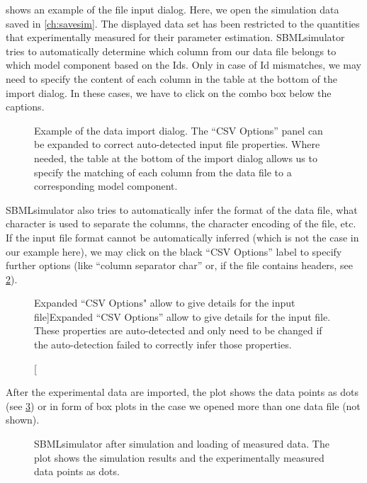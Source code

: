  shows an example of the file input dialog.
Here, we open the simulation data saved in \cref{ch:savesim}.
The displayed data set has been restricted to the quantities that \citeauthor{Bucher2011} experimentally measured for their parameter estimation.
SBMLsimulator tries to automatically determine which column from our data file belongs to which model component based on the \acp{Id}.
Only in case of \ac{Id} mismatches, we may need to specify the content of each column in the table at the bottom of the import dialog.
In these cases, we have to click on the combo box below the captions.
\begin{figure}[h]
\centering
{}
\caption[Example of the data import dialog]{Example of the data import dialog.
The ``CSV Options'' panel can be expanded to correct auto-detected input file properties.
Where needed, the table at the bottom of the import dialog allows us to specify the matching of each column from the data file to a corresponding model component.}
\label{fig:inputdialog}
\end{figure}

SBMLsimulator also tries to automatically infer the format of the data file, \eg what character is used to separate the columns, the character encoding of the file, etc.
If the input file format cannot be automatically inferred (which is not the case in our example here), we may click on the black ``CSV Options'' label to specify further options (like ``column separator char'' or, if the file contains headers, see \cref{fig:csvoptions}).
\begin{figure}[h]
\centering
{}
\caption[Expanded ``CSV Options" allow to give details for the input file]{Expanded ``CSV Options'' allow to give details for the input file.
These properties are auto-detected and only need to be changed if the auto-detection failed to correctly infer those properties.}
\label{fig:csvoptions}
\end{figure}

After the experimental data are imported, the plot shows the data points as dots (see \cref{fig:simulationResultsWithData}) or in form of box plots in the case we opened more than one data file (not shown).
\begin{figure}[t]
\centering
{}
\caption[SBMLsimulator after simulation and loading of measured data]{SBMLsimulator after simulation and loading of measured data.
The plot shows the simulation results and the experimentally measured data points as dots.}
\label{fig:simulationResultsWithData}
\end{figure}

